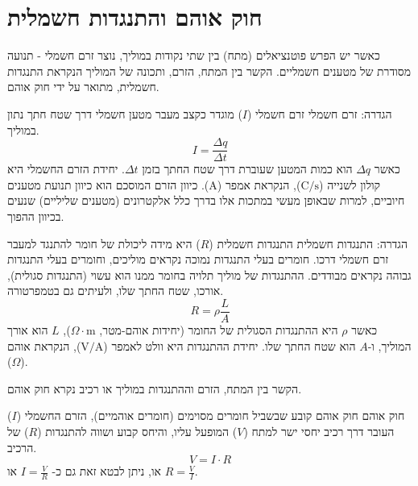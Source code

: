 \documentclass[12pt]{article}
\begin{document}
\section{חוק אוהם והתנגדות חשמלית}

כאשר יש הפרש פוטנציאלים (מתח) בין שתי נקודות במוליך, נוצר זרם חשמלי - תנועה מסודרת של מטענים חשמליים. הקשר בין המתח, הזרם, ותכונה של המוליך הנקראת התנגדות חשמלית, מתואר על ידי חוק אוהם.

\begin{definitionBox}{הגדרה: זרם חשמלי}
זרם חשמלי (\(I\)) מוגדר כקצב מעבר מטען חשמלי דרך שטח חתך נתון במוליך.
\begin{equation*}
I = \frac{\Delta q}{\Delta t}
\end{equation*}
כאשר \(\Delta q\) הוא כמות המטען שעוברת דרך שטח החתך בזמן \(\Delta t\).
יחידת הזרם החשמלי היא קולון לשנייה (\(\text{C}/\text{s}\)), הנקראת אמפר (\(\text{A}\)). כיוון הזרם המוסכם הוא כיוון תנועת מטענים חיוביים, למרות שבאופן מעשי במתכות אלו בדרך כלל אלקטרונים (מטענים שליליים) שנעים בכיוון ההפוך.
\end{definitionBox}

\begin{definitionBox}{הגדרה: התנגדות חשמלית}
התנגדות חשמלית (\(R\)) היא מידה ליכולת של חומר להתנגד למעבר זרם חשמלי דרכו. חומרים בעלי התנגדות נמוכה נקראים מוליכים, וחומרים בעלי התנגדות גבוהה נקראים מבודדים. ההתנגדות של מוליך תלויה בחומר ממנו הוא עשוי (התנגדות סגולית), אורכו, שטח החתך שלו, ולעיתים גם בטמפרטורה.
\begin{equation*}
R = \rho \frac{L}{A}
\end{equation*}
כאשר \(\rho\) היא ההתנגדות הסגולית של החומר (יחידות אוהם-מטר, \(\Omega \cdot \text{m}\)), \(L\) הוא אורך המוליך, ו-\(A\) הוא שטח החתך שלו.
יחידת ההתנגדות היא וולט לאמפר (\(\text{V}/\text{A}\)), הנקראת אוהם (\(\Omega\)).
\end{definitionBox}

הקשר בין המתח, הזרם וההתנגדות במוליך או רכיב נקרא חוק אוהם.

\begin{lawBox}{חוק אוהם}
חוק אוהם קובע שבשביל חומרים מסוימים (חומרים אוהמיים), הזרם החשמלי (\(I\)) העובר דרך רכיב יחסי ישר למתח (\(V\)) המופעל עליו, והיחס קבוע ושווה להתנגדות (\(R\)) של הרכיב.
\begin{equation*}
V = I \cdot R
\end{equation*}
או, ניתן לבטא זאת גם כ- \(I = \frac{V}{R}\) או \(R = \frac{V}{I}\).
\end{lawBox}
\end{document}
